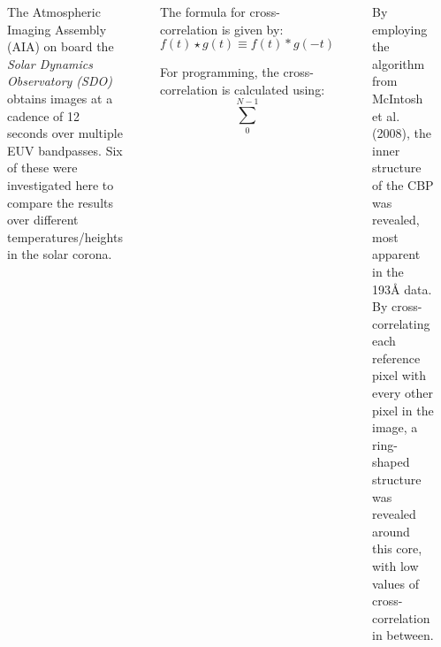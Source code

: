 \documentclass[t]{beamer}
\begin{document}
\begin{frame}[t]
\begin{columns}[t]
        \section{}
        \begin{tcolorbox}[title=Observations]
            \begin{columns}
                The Atmospheric Imaging Assembly (AIA)
                on board the \textit{Solar Dynamics Observatory (SDO)} obtains
                images at a cadence of 12 seconds over multiple EUV bandpasses.
                Six of these were investigated here to compare the results
                over different
                temperatures/heights in the solar corona.
            \end{columns}
        \end{tcolorbox}

        \section{}
        \begin{tcolorbox}[title=Methods]
            \begin{description}[style=nextline]
                \item [Mathematical] The formula for cross-correlation is
                    given by:
                    \[
                        f(t) \star g(t) \equiv f(t) \ast g(-t)
                        \]
                \item [Numerical] For programming, the cross-correlation
                    is calculated using:
                    \[
                        \sum_{0}^{N-1}
                        \]
            \end{description}
        \end{tcolorbox}


        \section{}
        \begin{tcolorbox}[title=Results]
            By employing the algorithm from McIntosh et al. (2008),
            the inner structure of the CBP was revealed, most apparent
            in the 193\AA{} data. By cross-correlating each reference
            pixel with every other pixel in the image, a ring-shaped
            structure was revealed around this core, with low values
            of cross-correlation in between.


\end{tcolorbox}
\end{columns}
\end{frame}
\end{document}
